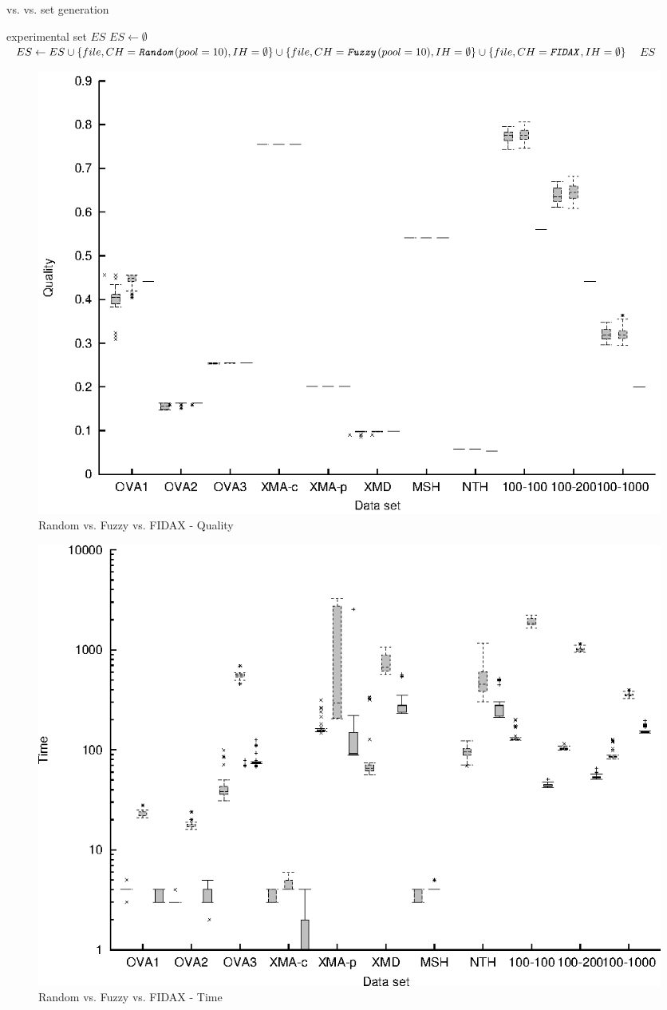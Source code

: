 \begin{algorithm}
\caption{ vs.  vs.  set generation}
\label{listing-experiment-random-fuzzy-fidax}
\begin{algorithmic}
\ENSURE experimental set $ES$
\STATE $ES \gets \emptyset$
    \STATE $ES \gets ES \cup \{file, CH = \texttt{\textit{Random}}(pool = 10), IH = \emptyset\} \cup \{file, CH = \texttt{\textit{Fuzzy}}(pool = 10), IH = \emptyset\} \cup \{file, CH = \texttt{\textit{FIDAX}}, IH = \emptyset\}$
  \ENDFOR
\ENDFOR
\RETURN $ES$
\end{algorithmic}
\end{algorithm}

\begin{figure}
  \caption{Random vs. Fuzzy vs. FIDAX - Quality}
  \label{image-experiment-random-fuzzy-fidax-quality}
  \centering
    \includegraphics[width=\textwidth]{images/experiments/random-fuzzy-fidax-quality}
\end{figure}

\begin{figure}
  \caption{Random vs. Fuzzy vs. FIDAX - Time}
  \label{image-experiment-random-fuzzy-fidax-time}
  \centering
    \includegraphics[width=\textwidth]{images/experiments/random-fuzzy-fidax-time}
\end{figure}

